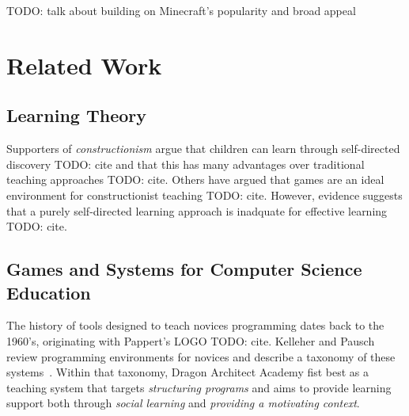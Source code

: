 \documentclass{sig-alternate}
\newcommand{\TODO}[1]{{\color{red} TODO: #1}}
\newcommand{\gametitle}{{\color{RoyalPurple} Dragon Architect Academy}}
\begin{document}
\TODO{talk about building on Minecraft's popularity and broad appeal}





\section{Related Work}

\subsection{Learning Theory}
\label{subsec:learning}
Supporters of \emph{constructionism} argue that children can learn through self-directed discovery \TODO{cite} and that this has many advantages over traditional teaching approaches \TODO{cite}.
Others have argued that games are an ideal environment for constructionist teaching \TODO{cite}.
However, evidence suggests that a purely self-directed learning approach is inadquate for effective learning \TODO{cite}.

\subsection{Games and Systems for Computer Science Education}
The history of tools designed to teach novices programming dates back to the 1960's, originating with Pappert's LOGO \TODO{cite}.
Kelleher and Pausch review programming environments for novices and describe a taxonomy of these systems~\cite{kelleher2005lowering}.
Within that taxonomy, \gametitle{} fist best as a teaching system that targets \emph{structuring programs} and aims to provide learning support both through \emph{social learning} and \emph{providing a motivating context}.
\end{document}

